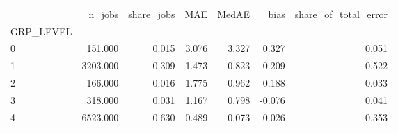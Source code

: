 \begin{tabular}{lrrrrrr}
\toprule
 & n_jobs & share_jobs & MAE & MedAE & bias & share_of_total_error \\
GRP_LEVEL &  &  &  &  &  &  \\
\midrule
0 & 151.000 & 0.015 & 3.076 & 3.327 & 0.327 & 0.051 \\
1 & 3203.000 & 0.309 & 1.473 & 0.823 & 0.209 & 0.522 \\
2 & 166.000 & 0.016 & 1.775 & 0.962 & 0.188 & 0.033 \\
3 & 318.000 & 0.031 & 1.167 & 0.798 & -0.076 & 0.041 \\
4 & 6523.000 & 0.630 & 0.489 & 0.073 & 0.026 & 0.353 \\
\bottomrule
\end{tabular}
